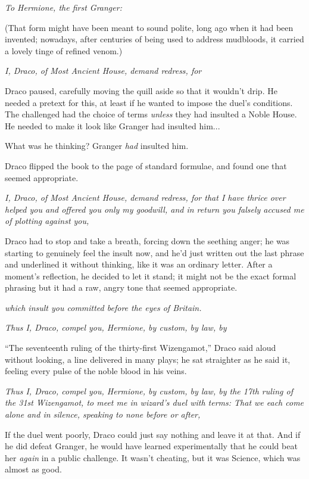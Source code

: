 \emph{To Hermione, the first Granger:}

(That form might have been meant to sound polite, long ago when it had
been invented; nowadays, after centuries of being used to address
mudbloods, it carried a lovely tinge of refined venom.)

\emph{I, Draco, of Most Ancient House, demand redress, for}

Draco paused, carefully moving the quill aside so that it wouldn't drip.
He needed a pretext for this, at least if he wanted to impose the duel's
conditions. The challenged had the choice of terms \emph{unless} they
had insulted a Noble House. He needed to make it look like Granger had
insulted him...

What was he thinking? Granger \emph{had} insulted him.

Draco flipped the book to the page of standard formulae, and found one
that seemed appropriate.

\emph{I, Draco, of Most Ancient House, demand redress, for that I have
thrice over helped you and offered you only my goodwill, and in return
you falsely accused me of plotting against you,}

Draco had to stop and take a breath, forcing down the seething anger; he
was starting to genuinely feel the insult now, and he'd just written out
the last phrase and underlined it without thinking, like it was an
ordinary letter. After a moment's reflection, he decided to let it
stand; it might not be the exact formal phrasing but it had a raw, angry
tone that seemed appropriate.

\emph{which insult you committed before the eyes of Britain.}

\emph{Thus I, Draco, compel you, Hermione, by custom, by law, by}

``The seventeenth ruling of the thirty-first Wizengamot,'' Draco said
aloud without looking, a line delivered in many plays; he sat straighter
as he said it, feeling every pulse of the noble blood in his veins.

\emph{Thus I, Draco, compel you, Hermione, by custom, by law, by the
17th ruling of the 31st Wizengamot, to meet me in wizard's duel with
terms: That we each come alone and in silence, speaking to none before
or after,}

If the duel went poorly, Draco could just say nothing and leave it at
that. And if he did defeat Granger, he would have learned experimentally
that he could beat her \emph{again} in a public challenge. It wasn't
cheating, but it was Science, which was almost as good.

